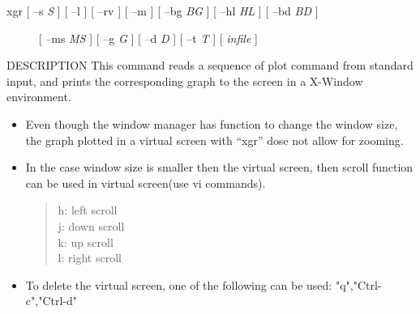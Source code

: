
\begin{synopsis}
 \item[xgr]   [ --s {\em S} ] [ --l ] [ --rv ] [ --m ] [ --bg {\em BG} ]
              [ --hl {\em HL} ] [ --bd {\em BD} ] 
 \item[\ ~~~~] [ --ms {\em MS} ] [ --g {\em G} ] [ --d {\em D} ]
              [ --t {\em T} ] [ {\em infile} ]
\end{synopsis} 

\begin{qsection}{DESCRIPTION}
This command reads a sequence of plot command from standard input,
and prints the corresponding graph to the screen in a X-Window
environment.
\begin{itemize}
\item Even though the window manager has function to
change the window size, the graph plotted in a virtual screen
with ``xgr'' dose not allow for zooming.
\item  In the case window size is smaller then the virtual screen,
then scroll function can be used in virtual screen(use vi commands).
\begin{quote}
		h: left scroll\\
		j: down scroll\\
		k: up scroll\\
		l: right scroll
\end{quote}
\item To delete the virtual screen, one of the following can be used:
"q","Ctrl-c","Ctrl-d"
\end{itemize}
\end{qsection}

